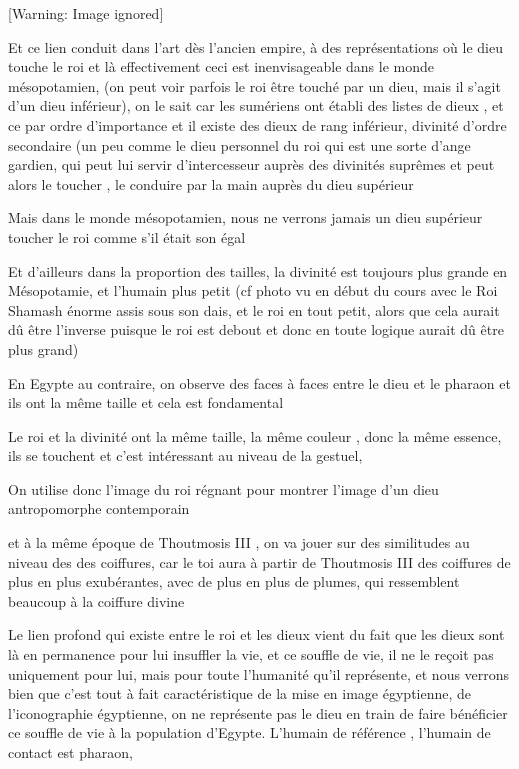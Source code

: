 \documentclass[a4paper,10pt]{article}
\begin{document}
  [Warning: Image ignored] %
 

Et ce lien conduit dans l'art dès
l'ancien empire, à des représentations où le dieu
touche le roi et là effectivement ceci est inenvisageable dans le monde
mésopotamien, (on peut voir parfois le roi être touché par un dieu,
mais il s'agit d'un dieu inférieur),
on le sait car les sumériens ont établi des listes de dieux , et ce par
ordre d'importance et il existe des dieux de rang
inférieur, divinité d'ordre secondaire (un peu comme
le dieu personnel du roi qui est une sorte d'ange
gardien, qui peut lui servir d'intercesseur auprès des
divinités suprêmes et peut alors le toucher , le conduire par la main
auprès du dieu supérieur

Mais dans le monde mésopotamien, nous ne verrons jamais un dieu
supérieur toucher le roi comme s'il était son égal

Et d'ailleurs dans la proportion des tailles, la
divinité est toujours plus grande en Mésopotamie, et
l'humain plus petit  (cf photo vu en début du cours
avec le Roi Shamash énorme assis sous son dais, et le roi en tout
petit,  alors que cela aurait dû être l'inverse
puisque le roi est debout et donc en toute logique aurait dû être plus
grand)

En Egypte au contraire, on observe des faces à faces entre le dieu et le
pharaon et ils ont la même taille et cela est fondamental 

Le roi et la divinité ont la même taille, la même couleur , donc la même
essence, ils se touchent et c'est intéressant au
niveau de la gestuel, 

On utilise donc l'image du roi régnant pour montrer
l'image d'un dieu antropomorphe
contemporain

et à la même époque de Thoutmosis III , on va jouer sur des similitudes
au niveau des des coiffures, car le toi aura à partir de Thoutmosis III
des coiffures de plus en plus exubérantes, avec de plus en plus de
plumes, qui ressemblent beaucoup à la coiffure divine

Le lien  profond qui existe entre le roi et les dieux vient du fait que
les dieux sont là en permanence pour lui insuffler la vie, et ce
souffle de vie, il ne le reçoit pas uniquement pour lui, mais pour
toute l'humanité qu'il représente, et
nous verrons bien que c'est tout à fait
caractéristique de la mise en image égyptienne, de
l'iconographie égyptienne, on ne représente pas le
dieu en train de faire bénéficier ce souffle de vie à  la population
d'Egypte. L'humain de référence ,
l'humain de contact est pharaon, 
\end{document}

